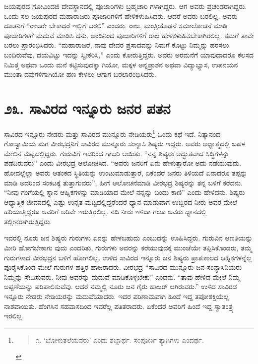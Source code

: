 ಜಯಪುರದ ಗೋವಿಂದಜಿ ದೇವಸ್ಥಾನದಲ್ಲಿ ಪೂಜಾರಿಗಳು ಬ್ರಹ್ಮಚಾರಿ ಗಳಾಗಿದ್ದರು. ಆಗ ಅವರು ಪ್ರಚಂಡರಾಗಿದ್ದರು. ಒಂದು ಸಲ ಜಯಪುರದ ಮಹಾರಾಜರು ಪೂಜಾರಿಗಳಿಗೆ ಹೇಳಿಕಳುಹಿಸಿದರು. ಆದರೆ ಅವರು ಬರಲಿಲ್ಲ. ಅವರು ದೂತನಿಗೆ “ರಾಜರೇ ಬೇಕಾದರೆ ಇಲ್ಲಿಗೆ ಬರಲಿ” ಎಂದರು. ರಾಜ, ಮಂತ್ರಿಯೊಡನೆ ಸಮಾಲೋಚನೆ ಮಾಡಿ ಪೂಜಾರಿಗಳಿಗೆ ಮದುವೆ ಮಾಡಿಸಿ ದನು. ಅಂದಿನಿಂದ ಪೂಜಾರಿಗಳಿಗೆ ರಾಜ ಹೇಳಿಕಳುಹಿಸಬೇಕಾಗಿರಲಿಲ್ಲ. ತಮಗೆ ತಾವೇ ಬರಲು ಪ್ರಾರಂಭಿಸಿದರು. “ಮಹಾರಾಜರೆ, ನಾವು ದೇವರ ಪ್ರಸಾದವನ್ನು ನಿಮಗೆ ಕೊಟ್ಟು ನಿಮ್ಮನ್ನು ಹರಸಲು ಬಂದಿರುವೆವು. ದಯವಿಟ್ಟು ಇದನ್ನು ಸ್ವೀಕರಿಸಿ,” ಎಂದು ಕೋರುತ್ತಿದ್ದರು. ಅವರು ಅರಮನೆಗೆ ಯಾವುದಾದರೂ ಕೆಲಸದ ನಿಮಿತ್ತ ಅಥವಾ ಒಂದು ಮನೆ ಕಟ್ಟಿಸುವುದಕ್ಕಾ ಗಿಯೋ, ಮಕ್ಕಳ ಅನ್ನಪ್ರಾಶನ ಅಥವಾ ವಿದ್ಯಾಭ್ಯಾಸ, ಉಪನಯನ ಮುಂತಾ ದವುಗಳಿಗಾಗಿಯೋ ಹಣ ಕೇಳಲು ಆಗಾಗ ಬರಲಾರಂಭಿಸಿದರು.


\section{\num{೨೩.} ಸಾವಿರದ ಇನ್ನೂರು ಜನರ ಪತನ}

ಸಾವಿರದ ಇನ್ನೂರು ನೇಡರು ಮತ್ತು ಸಾವಿರದ ಮುನ್ನೂರು ನೇಡಿಯರು\footnote{
\begin{verse}
೧. ‘ಬೋಳುತಲೆಯವರು’ ಎಂದು ಶಬ್ದಾರ್ಥ. ಸಂಪೂರ್ಣ ತ್ಯಾಗಿಗಳು ಎಂದರ್ಥ. 
\end{verse}} ಒಂದು ಕಥೆ ಇದೆ. ನಿತ್ಯಾನಂದ ಗೋಸ್ವಾಮಿಯ ಮಗ ವೀರಭದ್ರನಿಗೆ ಸಾವಿರದ ಮುನ್ನೂರು ಸಂನ್ಯಾಸಿ ಶಿಷ್ಯರು ಇದ್ದರು. ಅವರು ಅಧ್ಯಾತ್ಮದಲ್ಲಿ ಬಹಳ ಮೇಲಿನ ಮಟ್ಟದಲ್ಲಿದ್ದರು. ಗುರುವಿಗೆ ಇದರಿಂದ ಗಾಬರಿ ಆಯಿತು. “ನನ್ನ ಶಿಷ್ಯರು ಅದ್ಭುತವಾದ ಸಿದ್ಧಿಗಳನ್ನು ಪಡೆದಿರುವರು” ಎಂದು ವೀರಭದ್ರ ಆಲೋಚಿಸಿದ. “ಅವರು ಜನರಿಗೆ ಏನು ಹೇಳುತ್ತಾರೋ ಅದು ನಡೆಯುವುದು. ಹೋದಲ್ಲೆಲ್ಲಾ ಅವರು ಆತಂಕದ ಸ್ಥಿತಿಯನ್ನು ಉಂಟುಮಾಡುತ್ತಾರೆ, ಏಕೆಂದರೆ ಜನರು ತಿಳಿಯದೆ ಏನಾದರೂ ತಪ್ಪನ್ನು ಮಾಡಿ ಅದರಿಂದ ಸಂಕಟಕ್ಕೆ ತುತ್ತಾಗುವರು”, ಹೀಗೆ ಆಲೋಚನೆಮಾಡಿ ವೀರಭದ್ರ ಶಿಷ್ಯರನ್ನು ತನ್ನ ಬಳಿಗೆ ಕರೆದನು. “ನೀವು ಗಂಗೆಯಲ್ಲಿ ಸ್ನಾನ ಆಹ್ನಿಕಗಳನ್ನು ಮಾಡಿಯಾದ ಮೇಲೆ ನನ್ನನ್ನು ಬಂದು ಕಾಣಿ” ಎಂದು ಹೇಳಿದನು. ಶಿಷ್ಯರು ಆಧ್ಯಾತ್ಮಿಕ ಜೀವನದಲ್ಲಿ ಎಷ್ಟು ಉನ್ನತ ಮಟ್ಟದಲ್ಲಿದ್ದರೆಂದರೆ ಧ್ಯಾನ ಮಾಡುವಾಗ ಉಬ್ಬರದ ನೀರು ಅವರ ಮೇಲೆ ಹರಿಯುತ್ತಿದ್ದರೂ ಅವರಿಗೆ ಅರಿವೇ ಇರುತ್ತಿರಲಿಲ್ಲ. ನದಿ ನೀರು ಇಳಿದಾ ಗಲೂ ಅವರು ಧ್ಯಾನದಲ್ಲಿ ತಲ್ಲೀನರಾಗಿರುತ್ತಿದ್ದರು.

ಇವರಲ್ಲಿ ನೂರು ಜನ ಶಿಷ್ಯರು ಗುರುಗಳು ಏನನ್ನು ಹೇಳಬಹುದು ಎಂಬುದನ್ನು ಊಹಿಸಿದ್ದರು. ಗುರುವಿನ ಆಣತಿಯನ್ನು ಮೀರಿ ಹೋಗಬೇಕಾಗು ವುದು ಎಂದರಿತು, ಗುರುಗಳು ಅವರನ್ನು ಕರೆಯುವುದಕ್ಕೆ ಮುಂಚೆಯೇ ತಪ್ಪಿಸಿಕೊಂಡರು, ತಮ್ಮ ಗುರುಗಳಾದ ವೀರಭದ್ರನ ಬಳಿಗೆ ಹೋಗಲಿಲ್ಲ. ಉಳಿದ ಸಾವಿರದ ಇನ್ನೂರು ಜನ ಶಿಷ್ಯರು ಪ್ರಾತಃಕಾಲದ ಆಹ್ನಿಕಗಳನ್ನೆಲ್ಲ ಪೂರೈಸಿಕೊಂಡ ಮೇಲೆ ಗುರುಗಳ ಹತ್ತಿರ ಹಾಜರಾದರು. ವೀರಭದ್ರ “ಸಾವಿರದ ಮುನ್ನೂರು ಜನ ಸಂನ್ಯಾಸಿನಿಯರು ನಿಮ್ಮನ್ನು ಸೇವಿಸುವರು. ನೀವು ಅವರನ್ನು ಮದುವೆ ಮಾಡಿಕೊಳ್ಳಬೇಕು” ಎಂದನು. “ತಾವು ಹೇಳಿದ ಮೇಲೆ ನಿಮ್ಮ ಅಪ್ಪಣೆಯನ್ನು ಪರಿಪಾಲಿಸುವೆವು. ಆದರೆ ನಮ್ಮಲ್ಲಿ ನೂರು ಜನ ಗೈರು ಹಾಜರ್ ಆಗಿರುವರು.” ಉಳಿದ ಸಾವಿರದ ಇನ್ನೂರು ನೇಡರು ನೇಡಿಯರನ್ನು ಮದುವೆಯಾದರು. ಇದರ ಪರಿಣಾಮವಾಗಿ ಹಿಂದೆ ಇದ್ದ ತಪೋಶಕ್ತಿಯೆಲ್ಲ ನಾಶವಾಯಿತು. ಹೆಂಗಸಿನ ಸಹವಾಸದಿಂದ ಇವರೆಲ್ಲ ಪತಿತರಾದರು. ಏಕೆಂದರೆ ಅವರಿಗೆ ಹಿಂದೆ ಇದ್ದ ಸ್ವಾತಂತ್ರ್ಯ ಇರಲಿಲ್ಲ.


